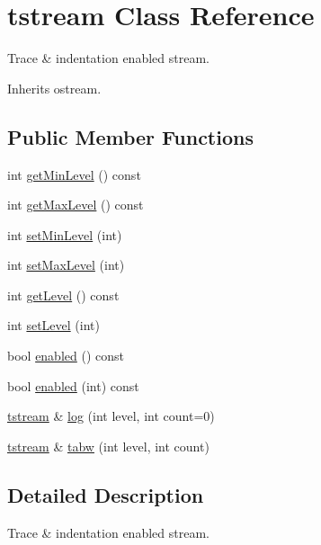 \hypertarget{clasststream}{}\section{tstream Class Reference}
\label{clasststream}


Trace \& indentation enabled stream.  




Inherits ostream.

\subsection*{Public Member Functions}
\begin{DoxyCompactItemize}
\item 
int \mbox{\hyperlink{clasststream_a86cfc3fc7bfa7d0064d27dea74d6888d}{get\+Min\+Level}} () const
\item 
int \mbox{\hyperlink{clasststream_abb7ecc2e0ddeab5442d52acb2ea5fd64}{get\+Max\+Level}} () const
\item 
int \mbox{\hyperlink{clasststream_a0dad8cbc8fc5611b788f55c75a20a88e}{set\+Min\+Level}} (int)
\item 
int \mbox{\hyperlink{clasststream_a75cb778234d7b49d9e89c73e6efcd132}{set\+Max\+Level}} (int)
\item 
int \mbox{\hyperlink{clasststream_a01c90e5cc80064cae20d3a4bc3320683}{get\+Level}} () const
\item 
int \mbox{\hyperlink{clasststream_a37fa7894d7ae83674ee7cb5a69a4c4a5}{set\+Level}} (int)
\item 
bool \mbox{\hyperlink{clasststream_a01303d5c2c5cd83d06985622ca50d77b}{enabled}} () const
\item 
bool \mbox{\hyperlink{clasststream_a3dab6aeefd316ad326a29cec3c2c574b}{enabled}} (int) const
\item 
\mbox{\hyperlink{clasststream}{tstream}} \& \mbox{\hyperlink{clasststream_a1fe9745dc492e891a6e765e34fa082c3}{log}} (int level, int count=0)
\item 
\mbox{\hyperlink{clasststream}{tstream}} \& \mbox{\hyperlink{clasststream_a5aa7a21d7b95f1bf40e68b5b13118fd0}{tabw}} (int level, int count)
\end{DoxyCompactItemize}


\subsection{Detailed Description}
Trace \& indentation enabled stream. 

